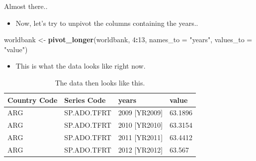 \documentclass[10pt,ignorenonframetext,]{beamer}
\newenvironment{Shaded}{\begin{snugshade}}{\end{snugshade}}
\newcommand{\DataTypeTok}[1]{\textcolor[rgb]{0.13,0.29,0.53}{#1}}
\newcommand{\DecValTok}[1]{\textcolor[rgb]{0.00,0.00,0.81}{#1}}
\newcommand{\KeywordTok}[1]{\textcolor[rgb]{0.13,0.29,0.53}{\textbf{#1}}}
\newcommand{\NormalTok}[1]{#1}
\newcommand{\OperatorTok}[1]{\textcolor[rgb]{0.81,0.36,0.00}{\textbf{#1}}}
\newcommand{\StringTok}[1]{\textcolor[rgb]{0.31,0.60,0.02}{#1}}
\providecommand{\tightlist}{%
  \setlength{\itemsep}{0pt}\setlength{\parskip}{0pt}}
\begin{document}
\begin{frame}[fragile]{Almost there..}
\protect\hypertarget{almost-there..}{}

\begin{itemize}
\tightlist
\item
  Now, let's try to unpivot the columns containing the years..
\end{itemize}

\begin{Shaded}
\begin{Highlighting}[]
\NormalTok{worldbank <-}\StringTok{ }\KeywordTok{pivot_longer}\NormalTok{(worldbank, }\DecValTok{4}\OperatorTok{:}\DecValTok{13}\NormalTok{, }
             \DataTypeTok{names_to =} \StringTok{"years"}\NormalTok{, }
             \DataTypeTok{values_to =} \StringTok{"value"}\NormalTok{)}
\end{Highlighting}
\end{Shaded}

\begin{itemize}
\tightlist
\item
  This is what the data looks like right now.
\end{itemize}

\begin{table}

\caption{\label{tab:unnamed-chunk-11}The data then looks like this.}
\centering
\begin{tabular}[t]{llll}
\toprule
Country Code & Series Code & years & value\\
\midrule
\rowcolor{gray!6}  ARG & SP.ADO.TFRT & 2009 [YR2009] & 63.1896\\
ARG & SP.ADO.TFRT & 2010 [YR2010] & 63.3154\\
\rowcolor{gray!6}  ARG & SP.ADO.TFRT & 2011 [YR2011] & 63.4412\\
ARG & SP.ADO.TFRT & 2012 [YR2012] & 63.567\\
\bottomrule
\end{tabular}
\end{table}

\end{frame}
\end{document}
